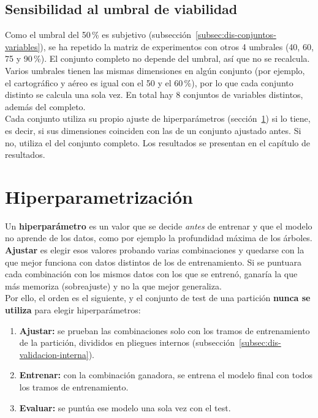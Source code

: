 \subsection{Sensibilidad al umbral de viabilidad}
\label{subsec:dis-sensibilidad}

Como el umbral del 50\,\% es subjetivo (subsección~\ref{subsec:dis-conjuntos-variables}), se ha repetido la matriz de experimentos con otros 4 umbrales (40, 60, 75 y 90\,\%). El conjunto completo no depende del umbral, así que no se recalcula.
\\

Varios umbrales tienen las mismas dimensiones en algún conjunto (por ejemplo, el cartográfico y aéreo es igual con el 50 y el 60\,\%), por lo que cada conjunto distinto se calcula una sola vez. En total hay 8 conjuntos de variables distintos, además del completo.
\\

Cada conjunto utiliza su propio ajuste de hiperparámetros (sección~\ref{sec:dis-hiperparametrizacion}) si lo tiene, es decir, si sus dimensiones coinciden con las de un conjunto ajustado antes. Si no, utiliza el del conjunto completo. Los resultados se presentan en el capítulo de resultados.
\\

\section{Hiperparametrización}
\label{sec:dis-hiperparametrizacion}

Un \textbf{hiperparámetro} es un valor que se decide \emph{antes} de entrenar y que el modelo no aprende de los datos, como por ejemplo la profundidad máxima de los árboles. \textbf{Ajustar} es elegir esos valores probando varias combinaciones y quedarse con la que mejor funciona con datos distintos de los de entrenamiento. Si se puntuara cada combinación con los mismos datos con los que se entrenó, ganaría la que más memoriza (\gls{sobreajuste}) y no la que mejor generaliza.
\\

Por ello, el orden es el siguiente, y el conjunto de test de una partición \textbf{nunca se utiliza} para elegir hiperparámetros:

\begin{enumerate}
  \item \textbf{Ajustar:} se prueban las combinaciones solo con los tramos de entrenamiento de la partición, divididos en pliegues internos (subsección~\ref{subsec:dis-validacion-interna}).
  \item \textbf{Entrenar:} con la combinación ganadora, se entrena el modelo final con todos los tramos de entrenamiento.
  \item \textbf{Evaluar:} se puntúa ese modelo una sola vez con el test.
\end{enumerate}

